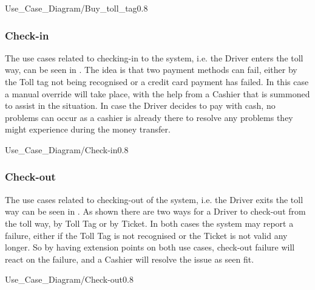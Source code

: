 \begin{myfigure}{Use_Case_Diagram/Buy_toll_tag}{0.8}
\caption{Use cases related to buying a toll tag. \madeby{\mb}{\af}}
\label{fig:usecase_buytolltag}
\end{myfigure}

\subsubsection{Check-in}
\madeby{\mb}{\af}
The use cases related to checking-in to the system, i.e. the Driver enters the toll way, can be seen in . The idea is that two payment methods can fail, either by the Toll tag not being recognised or a credit card payment has failed. In this case a manual override will take place, with the help from a Cashier that is summoned to assist in the situation. 
In case the Driver decides to pay with cash, no problems can occur as a cashier is already there to resolve any problems they might experience during the money transfer. 

\begin{myfigure}{Use_Case_Diagram/Check-in}{0.8}
\caption{Use cases related to checking-in to the toll way. \madeby{\jb}{\mt}}
\label{fig:usecase_checkin}
\end{myfigure}

\subsubsection{Check-out}
\madeby{\mt}{\kj}
The use cases related to checking-out of the system, i.e. the Driver exits the toll way can be seen in . As shown there are two ways for a Driver to check-out from the toll way, by Toll Tag or by Ticket. In both cases the system may report a failure, either if the Toll Tag is not recognised or the Ticket is not valid any longer. So by having extension points on both use cases, check-out failure will react on the failure, and a Cashier will resolve the issue as seen fit. 

\begin{myfigure}{Use_Case_Diagram/Check-out}{0.8}
\caption{Use cases related to checking-out of the toll way.\madeby{\mb}{\af}}
\label{fig:usecase_checkout}
\end{myfigure}